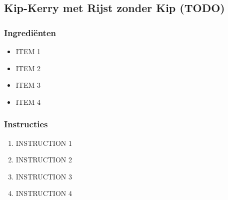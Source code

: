 \subsection{Kip-Kerry met Rijst zonder Kip (TODO)}
\subsubsection*{Ingrediënten}
\begin{multicols}{2}
    \begin{itemize}
        \item ITEM 1
        \item ITEM 2
        \item ITEM 3
        \item ITEM 4
    \end{itemize}
\end{multicols}

\subsubsection*{Instructies}
\begin{multicols}{2}
    \begin{enumerate}
        \item INSTRUCTION 1
        \item INSTRUCTION 2
        \item INSTRUCTION 3
        \item INSTRUCTION 4
    \end{enumerate}
\end{multicols}